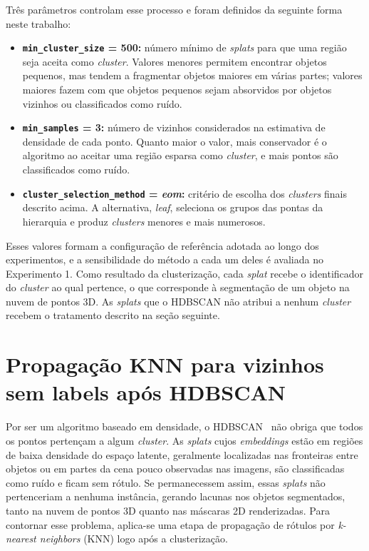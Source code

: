 Três parâmetros controlam esse processo e foram definidos da seguinte forma neste trabalho:

\begin{itemize}
    \item \textbf{\texttt{min\_cluster\_size} = 500:} número mínimo de \emph{splats} para que uma região seja aceita como \textit{cluster}. Valores menores permitem encontrar objetos pequenos, mas tendem a fragmentar objetos maiores em várias partes; valores maiores fazem com que objetos pequenos sejam absorvidos por objetos vizinhos ou classificados como ruído.

    \item \textbf{\texttt{min\_samples} = 3:} número de vizinhos considerados na estimativa de densidade de cada ponto. Quanto maior o valor, mais conservador é o algoritmo ao aceitar uma região esparsa como \textit{cluster}, e mais pontos são classificados como ruído.

    \item \textbf{\texttt{cluster\_selection\_method} = \textit{eom}:} critério de escolha dos \textit{clusters} finais descrito acima. A alternativa, \textit{leaf}, seleciona os grupos das pontas da hierarquia e produz \textit{clusters} menores e mais numerosos.
\end{itemize}

Esses valores formam a configuração de referência adotada ao longo dos experimentos, e a sensibilidade do método a cada um deles é avaliada no Experimento 1. Como resultado da clusterização, cada \emph{splat} recebe o identificador do \textit{cluster} ao qual pertence, o que corresponde à segmentação de um objeto na nuvem de pontos 3D. As \emph{splats} que o HDBSCAN não atribui a nenhum \textit{cluster} recebem o tratamento descrito na seção seguinte.

\section{Propagação KNN para vizinhos sem labels após HDBSCAN}

Por ser um algoritmo baseado em densidade, o HDBSCAN~\cite{campello2015hierarchical} não obriga que todos os pontos pertençam a algum \textit{cluster}. As \emph{splats} cujos \textit{embeddings} estão em regiões de baixa densidade do espaço latente, geralmente localizadas nas fronteiras entre objetos ou em partes da cena pouco observadas nas imagens, são classificadas como ruído e ficam sem rótulo. Se permanecessem assim, essas \emph{splats} não pertenceriam a nenhuma instância, gerando lacunas nos objetos segmentados, tanto na nuvem de pontos 3D quanto nas máscaras 2D renderizadas. Para contornar esse problema, aplica-se uma etapa de propagação de rótulos por \textit{k-nearest neighbors} (KNN) logo após a clusterização.

